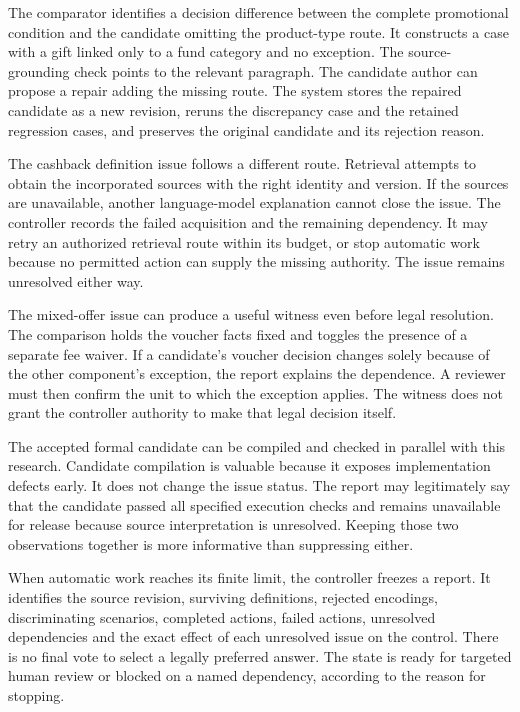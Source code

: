 The comparator identifies a decision difference between the complete promotional
condition and the candidate omitting the product-type route. It constructs a
case with a gift linked only to a fund category and no exception. The
source-grounding check points to the relevant paragraph. The candidate author
can propose a repair adding the missing route. The system stores the repaired
candidate as a new revision, reruns the discrepancy case and the retained
regression cases, and preserves the original candidate and its rejection reason.

The cashback definition issue follows a different route. Retrieval attempts to
obtain the incorporated sources with the right identity and version. If the
sources are unavailable, another language-model explanation cannot close the
issue. The controller records the failed acquisition and the remaining
dependency. It may retry an authorized retrieval route within its budget, or
stop automatic work because no permitted action can supply the missing
authority. The issue remains unresolved either way.


The mixed-offer issue can produce a useful witness even before legal resolution.
The comparison holds the voucher facts fixed and toggles the presence of a
separate fee waiver. If a candidate's voucher decision changes solely because
of the other component's exception, the report explains the dependence. A
reviewer must then confirm the unit to which the exception applies. The witness
does not grant the controller authority to make that legal decision itself.

The accepted formal candidate can be compiled and checked in parallel with this
research. Candidate compilation is valuable because it exposes implementation
defects early. It does not change the issue status. The report may legitimately
say that the candidate passed all specified execution checks and remains
unavailable for release because source interpretation is unresolved. Keeping
those two observations together is more informative than suppressing either.

When automatic work reaches its finite limit, the controller freezes a report.
It identifies the source revision, surviving definitions, rejected encodings,
discriminating scenarios, completed actions, failed actions, unresolved
dependencies and the exact effect of each unresolved issue on the control.
There is no final vote to select a legally preferred answer. The state is ready
for targeted human review or blocked on a named dependency, according to the
reason for stopping.

